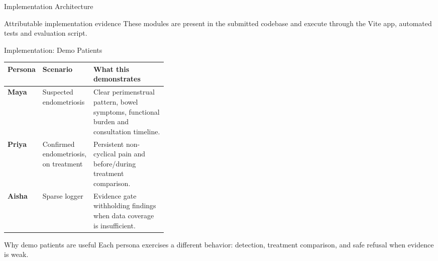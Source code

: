 \documentclass[aspectratio=169,11pt]{beamer}
\begin{document}
\begin{frame}{Implementation Architecture}
  \begin{center}
  \end{center}

  \vspace{1mm}
  \begin{block}{Attributable implementation evidence}
    These modules are present in the submitted codebase and execute through the Vite app, automated tests and evaluation script.
  \end{block}
\end{frame}

\begin{frame}{Implementation: Demo Patients}
  \scriptsize
  \begin{tabularx}{\linewidth}{>{\bfseries}p{0.15\linewidth} p{0.22\linewidth} X}
    \toprule
    Persona & Scenario & What this demonstrates \\
    \midrule
    Maya & Suspected endometriosis & Clear perimenstrual pattern, bowel symptoms, functional burden and consultation timeline. \\
    Priya & Confirmed endometriosis, on treatment & Persistent non-cyclical pain and before/during treatment comparison. \\
    Aisha & Sparse logger & Evidence gate withholding findings when data coverage is insufficient. \\
    \bottomrule
  \end{tabularx}

  \vspace{2mm}
  \begin{block}{Why demo patients are useful}
    Each persona exercises a different behavior: detection, treatment comparison, and safe refusal when evidence is weak.
  \end{block}
\end{frame}
\end{document}
